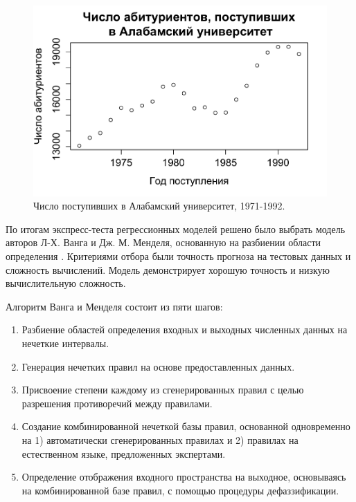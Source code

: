 \begin{figure}[bhtp]
	\begin{center}			
		\includegraphics{images/UA_enrollments.pdf}
		\caption{Число поступивших в Алабамский университет, 1971-1992.}		
		\label{figure:UA_enrollments}
	\end{center}
\end{figure}

По итогам экспресс-теста регрессионных моделей решено было выбрать модель авторов Л-Х. Ванга и Дж. М. Менделя, основанную на разбиении области определения \cite{Wang1992}. Критериями отбора были точность прогноза на тестовых данных и сложность вычислений. Модель демонстрирует хорошую точность и низкую вычислительную сложность. 

Алгоритм Ванга и Менделя состоит из пяти шагов:
\begin{enumerate}
	\item Разбиение областей определения входных и выходных численных данных на нечеткие интервалы.
	\item Генерация нечетких правил на основе предоставленных данных.
	\item Присвоение степени каждому из сгенерированных правил с целью разрешения противоречий между правилами.
	\item Создание комбинированной нечеткой базы правил, основанной одновременно на 1) автоматически сгенерированных правилах и
	   2) правилах на естественном языке, предложенных экспертами.
	
	\item Определение отображения входного пространства на выходное, основываясь на комбинированной базе правил, с помощью процедуры дефаззификации.
\end{enumerate}

